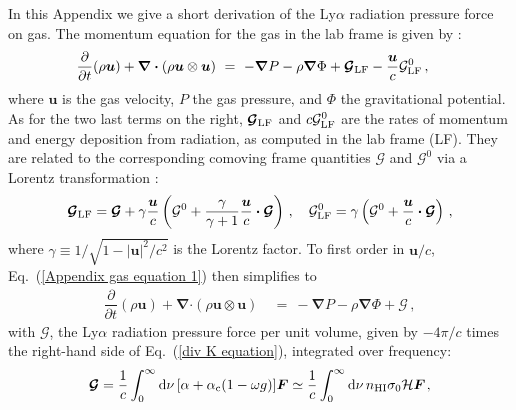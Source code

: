 \documentclass[fleqn,usenatbib]{mnras}
\begin{document}
In this Appendix we give a short derivation of the Ly$\alpha$ radiation pressure force on gas. The momentum equation for the gas in the lab frame is given by \citep[e.g.][]{Mihalas2001, Castor2004, Smith2017}:
\begin{align}
\dfrac{\partial }{\partial t} (\rho \boldsymbol{u}) + \boldsymbol{\nabla} \boldsymbol{\cdot} (\rho \boldsymbol{u} \otimes \boldsymbol{u}) ~&=~ - \boldsymbol{\nabla}P - \rho \boldsymbol{\nabla}\Phi + \boldsymbol{\mathcal{G}}_{\rm LF} - \dfrac{\boldsymbol{u}}{c} \mathcal{G}_{\rm LF}^{0} \, , \label{Appendix gas equation 1}
\end{align}
where $\boldsymbol{u}$ is the gas velocity, $P$ the gas pressure, and $\Phi$ the gravitational potential. As for the two last terms on the right, $\boldsymbol{\mathcal{G}}_{\rm LF}$ and $c \mathcal{G}_{\rm LF}^{0}$ are the rates of momentum and energy deposition from radiation, as computed in the lab frame (LF). They are related to the corresponding comoving frame quantities $\boldsymbol{\mathcal{G}}$ and $\mathcal{G}^0$ via a Lorentz transformation \citep{Mihalas2001}:
\begin{equation}
    \boldsymbol{\mathcal{G}}_{\rm LF} = \boldsymbol{\mathcal{G}} + \gamma \dfrac{\boldsymbol{u}}{c} \left( \mathcal{G}^0 + \dfrac{\gamma}{\gamma + 1} \dfrac{\boldsymbol{u}}{c} \boldsymbol{\cdot} \boldsymbol{\mathcal{G}} \right) \, , \hspace{10 pt} \mathcal{G}_{\rm LF}^0 = \gamma \left( \mathcal{G}^0 + \dfrac{\boldsymbol{u}}{c} \boldsymbol{\cdot} \boldsymbol{\mathcal{G}} \right) \, ,
\end{equation}
where $\gamma \equiv 1/\sqrt{1 - \lvert \boldsymbol{u} \rvert^2/c^2}$ is the Lorentz factor. To first order in $\boldsymbol{u}/c$, Eq.~(\ref{Appendix gas equation 1}) then simplifies to 
\begin{align}
\dfrac{\partial }{\partial t} (\rho \boldsymbol{u}) + \boldsymbol{\nabla} \boldsymbol{\cdot} (\rho \boldsymbol{u} \otimes \boldsymbol{u}) ~&=~ - \boldsymbol{\nabla}P - \rho \boldsymbol{\nabla}\Phi + \boldsymbol{\mathcal{G}} \, ,
\end{align}
with $\boldsymbol{\mathcal{G}}$, the Ly$\alpha$ radiation pressure force per unit volume, given by $-4\pi/c$ times the right-hand side of Eq.~(\ref{div K equation}), integrated over frequency:
\begin{equation}
    \boldsymbol{\mathcal{G}} = \dfrac{1}{c} \int_{0}^{\infty} \textrm{d}\nu \, [\alpha + \alpha_{\rm c}(1 - \omega g)] \boldsymbol{F} \simeq \dfrac{1}{c} \int_{0}^{\infty} \textrm{d}\nu \, n_{\rm HI} \sigma_0 \mathcal{H} \boldsymbol{F} \hspace{1 pt} \label{Lya force per unit volume},
\end{equation}
\end{document}
